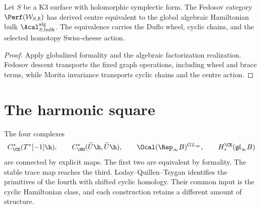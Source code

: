 \begin{corollary}
Let $S$ be a K3 surface with holomorphic symplectic form.  The Fedosov category $\Perf(\mathcal W_{S,\hbar})$ has derived centre equivalent to the global algebraic Hamiltonian bulk $\Acal^{\mathrm{alg}}_{S,\mathrm{bulk}}$.  The equivalence carries the Duflo wheel, cyclic chains, and the selected homotopy Swiss-cheese action.
\end{corollary}
\begin{proof}
Apply globalized formality and the algebraic factorization realization.  Fedosov descent transports the fixed graph operations, including wheel and brace terms, while Morita invariance transports cyclic chains and the centre action.
\end{proof}

\chapter{The harmonic square}
The four complexes
\[
 C^*_{\CE}(T^*[-1]\h),
 \qquad
 C^*_{\HH}(\widehat U\h,\widehat U\h),
 \qquad
 \Ocal(\Rep_\infty B)^{GL_\infty},
 \qquad
 H_*^{\CE}(\mathfrak{gl}_\infty B)
\]
are connected by explicit maps.  The first two are equivalent by formality.  The stable trace map reaches the third.  Loday--Quillen--Tsygan identifies the primitives of the fourth with shifted cyclic homology.  Their common input is the cyclic Hamiltonian class, and each construction retains a different amount of structure.

